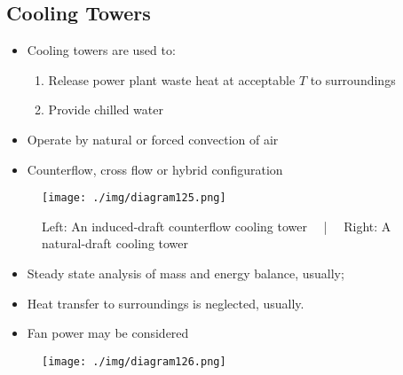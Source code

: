 \subsection{Cooling Towers}
\begin{itemize}[noitemsep]
  \item Cooling towers are used to:
        \begin{enumerate}[noitemsep]
          \item Release power plant waste heat at acceptable $T$ to surroundings
          \item Provide chilled water
        \end{enumerate}
  \item Operate by natural or forced convection of air
  \item Counterflow, cross flow or hybrid configuration
\end{itemize}
\begin{figure}[H]
  \centering
  \texttt{[image: ./img/diagram125.png]}
  \caption{Left: An induced-draft counterflow cooling tower \ \ | \ \ Right: A natural-draft cooling tower}
\end{figure}
\begin{itemize}[noitemsep]
  \item Steady state analysis of mass and energy balance, usually;
  \item Heat transfer to surroundings is neglected, usually.
  \item Fan power may be considered
\end{itemize}
\begin{figure}[H]
  \centering
  \texttt{[image: ./img/diagram126.png]}
  \caption{}
\end{figure}